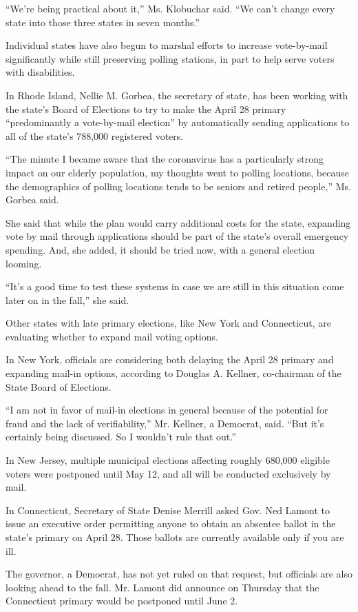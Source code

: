 ``We're being practical about it,'' Ms. Klobuchar said. ``We can't
change every state into those three states in seven months.''

Individual states have also begun to marshal efforts to increase
vote-by-mail significantly while still preserving polling stations, in
part to help serve voters with disabilities.

In Rhode Island, Nellie M. Gorbea, the secretary of state, has been
working with the state's Board of Elections to try to make the April 28
primary ``predominantly a vote-by-mail election'' by automatically
sending applications to all of the state's 788,000 registered voters.

``The minute I became aware that the coronavirus has a particularly
strong impact on our elderly population, my thoughts went to polling
locations, because the demographics of polling locations tends to be
seniors and retired people,'' Ms. Gorbea said.

She said that while the plan would carry additional costs for the state,
expanding vote by mail through applications should be part of the
state's overall emergency spending. And, she added, it should be tried
now, with a general election looming.

``It's a good time to test these systems in case we are still in this
situation come later on in the fall,'' she said.

Other states with late primary elections, like New York and Connecticut,
are evaluating whether to expand mail voting options.

In New York, officials are considering both delaying the April 28
primary and expanding mail-in options, according to Douglas A. Kellner,
co-chairman of the State Board of Elections.

``I am not in favor of mail-in elections in general because of the
potential for fraud and the lack of verifiability,'' Mr. Kellner, a
Democrat, said. ``But it's certainly being discussed. So I wouldn't rule
that out.''

In New Jersey, multiple municipal elections affecting roughly 680,000
eligible voters were postponed until May 12, and all will be conducted
exclusively by mail.

In Connecticut, Secretary of State Denise Merrill asked Gov. Ned Lamont
to issue an executive order permitting anyone to obtain an absentee
ballot in the state's primary on April 28. Those ballots are currently
available only if you are ill.

The governor, a Democrat, has not yet ruled on that request, but
officials are also looking ahead to the fall. Mr. Lamont did announce on
Thursday that the Connecticut primary would be postponed until June 2.

